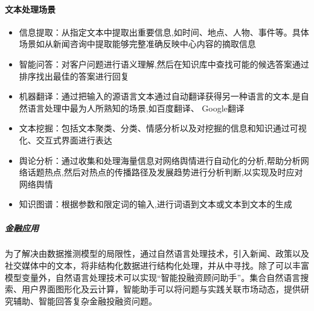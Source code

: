\documentclass[letterpaper,10pt,english]{sphinxmanual}
\begin{document}
\paragraph{文本处理场景}
\label{\detokenize{chapter_AI_dive/NLP:id18}}\begin{itemize}
\item {} 
信息提取：从指定文本中提取出重要信息,如时间、地点、人物、事件等。具体场景如从新闻咨询中提取能够完整准确反映中心内容的摘取信息

\item {} 
智能问答：对客户问题进行语义理解,然后在知识库中查找可能的候选答案通过排序找出最佳的答案进行回复

\item {} 
机器翻译：通过把输入的源语言文本通过自动翻译获得另一种语言的文本,是自然语言处理中最为人所熟知的场景,如百度翻译、
Google翻译

\item {} 
文本挖掘：包括文本聚类、分类、情感分析以及对挖掘的信息和知识通过可视化、交互式界面进行表达

\item {} 
舆论分析：通过收集和处理海量信息对网络舆情进行自动化的分析,帮助分析网络话题热点,然后对热点的传播路径及发展趋势进行分析判断,以实现及时应对网络舆情

\item {} 
知识图谱：根据参数和限定词的输入,进行词语到文本或文本到文本的生成%
\begin{footnote}[955]\sphinxAtStartFootnote
{}
%
\end{footnote}

\end{itemize}


\subparagraph{金融应用}
\label{\detokenize{chapter_AI_dive/NLP:id19}}
为了解决由数据推测模型的局限性，通过自然语言处理技术，引入新闻、政策以及社交媒体中的文本，将非结构化数据进行结构化处理，并从中寻找。除了可以丰富模型变量外，自然语言处理技术可以实现“智能投融资顾问助手”。集合自然语言搜索、用户界面图形化及云计算，智能助手可以将问题与实践关联市场动态，提供研究辅助、智能回答复杂金融投融资问题。%
\begin{footnote}[956]\sphinxAtStartFootnote
{}
%
\end{footnote}
\end{document}
